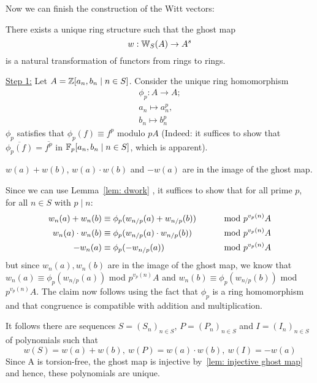 Now we can finish the construction of the Witt vectors:
\begin{theorem} \label{thm: existence of Witt vectors}
    There exists a unique ring structure such that the ghost map 
    \[
      w:\mathbb{W}_S(A) \to A^s  
    \]
    is a natural transformation of functors from rings to rings.
\end{theorem}
\begin{bigproof}
    \underline{Step 1:} Let $A=\mathbb{Z} [a_n,b_n \mid n \in S]$. Consider the unique
    ring homomorphism 
    \begin{align*}
        \phi_p \colon A \to A; \\
        a_n \mapsto a_n^p, \\
        b_n \mapsto b_n^p
    \end{align*}
    $\phi_p$ satisfies that $\phi_p(f) \equiv f^p$ modulo $pA$ (Indeed: it suffices to show that $\overline{\phi_p(f)}
    = \overline{f^p}$ in $\mathbb{F}_p[a_n,b_n \mid n \in S]$, which is apparent). \todo{}
    \begin{claim*}
        $w(a)+w(b)$, $w(a) \cdot w(b)$ and $-w(a)$ are in the image of the ghost map.
    \end{claim*}
    \begin{smallproof}
        Since we can use Lemma~\ref{lem: dwork} , it suffices to show that
        for all prime $p$, for all $n \in S$ with $p \mid n$:
        \begin{align*}
           w_n(a)+w_n(b) &\equiv \phi_p(w_{n/p}(a)+w_{n/p}(b)) &\text{\hskip8mm mod } p^{v_p(n)}A \\
           w_n(a)\cdot w_n(b) &\equiv \phi_p(w_{n/p}(a) \cdot w_{n/p}(b)) &\text{\hskip8mm mod } p^{v_p(n)}A \\
           -w_n(a) &\equiv \phi_p(-w_{n/p}(a)) &\text{\hskip8mm mod } p^{v_p(n)}A
        \end{align*} 
        but since $w_n(a), w_n(b)$ are in the image of the ghost map, we know that
        $w_n(a) \equiv \phi_p(w_{n/p}(a))$ mod $p^{v_p(n)}A$ and 
        $w_n(b) \equiv \phi_p(w_{n/p}(b))$ mod $p^{v_p(n)}A$.
        The claim now follows using the fact that $\phi_p$ is a ring homomorphism and 
        that congruence is compatible with addition and multiplication.
        \end{smallproof}
    It follows there are sequences $S = (S_n)_{n \in S}$, $P = (P_n)_{n \in S}$
    and $I = (I_n)_{n \in S}$ of polynomials such that
    \[
        w(S) = w(a) + w(b), \ w(P) = w(a) \cdot w(b), \ w(I) = -w(a)
    \]
    Since A is torsion-free, the ghost map is injective by~\ref{lem: injective ghost map}
    and hence, these polynomials are unique.


\end{bigproof}
